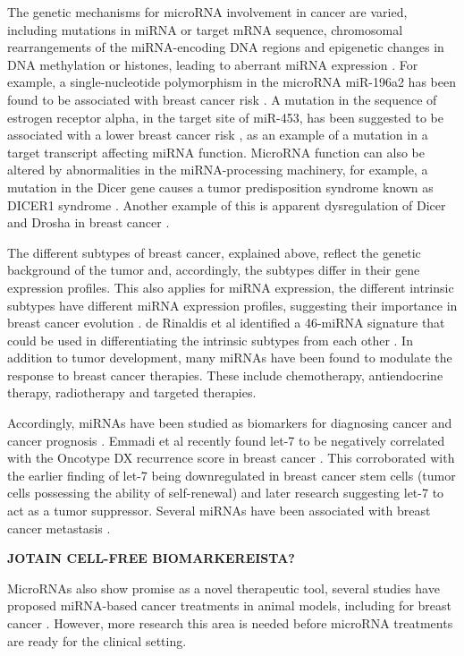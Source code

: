 The genetic mechanisms for microRNA involvement in cancer are varied,
including mutations in miRNA or target mRNA sequence, chromosomal
rearrangements of the miRNA-encoding DNA regions and epigenetic changes in DNA
methylation or histones, leading to aberrant miRNA expression
\citep{Calin2006,Melo2011}. For example, a single-nucleotide polymorphism
in the microRNA miR-196a2 has been found to be associated with breast cancer
risk \citep{Gao2011}. A mutation in the sequence of estrogen receptor alpha,
in the target site of miR-453, has been suggested to be associated with a
lower breast cancer risk \citep{Tchatchou2009}, as an example of a mutation in
a target transcript affecting miRNA function. MicroRNA function can also be
altered by abnormalities in the miRNA-processing machinery, for example, a
mutation in the Dicer gene causes a tumor predisposition syndrome known as
DICER1 syndrome \citep{Slade2011}. Another example of this is apparent
dysregulation of Dicer and Drosha in breast cancer
\citep{Yan2012}.

The different subtypes of breast cancer, explained above, reflect the genetic
background of the tumor and, accordingly, the subtypes differ in their gene
expression profiles. This also applies for miRNA expression, the different
intrinsic subtypes have different miRNA expression profiles, suggesting their
importance in breast cancer evolution \citep{Blenkiron2007}. de Rinaldis et al
identified a 46-miRNA signature that could be used in differentiating the
intrinsic subtypes from each other \citep{deRinaldis2013}. In addition to
tumor development, many miRNAs have been found to modulate the response to
breast cancer therapies. These include chemotherapy, antiendocrine therapy,
radiotherapy and targeted therapies.

Accordingly, miRNAs have been studied as biomarkers for diagnosing cancer and
cancer prognosis \citep{}. Emmadi et al recently found let-7 to be negatively
correlated with the Oncotype DX recurrence score in breast cancer
\citep{Emmadi2015}. This corroborated with the earlier finding of let-7 being
downregulated in breast cancer stem cells (tumor cells possessing the ability
of self-renewal) \citep{Yu2007} and later research suggesting let-7 to act as
a tumor suppressor. Several miRNAs have been associated with breast cancer
metastasis \citep{Chen2016}.

\textbf{JOTAIN CELL-FREE BIOMARKEREISTA?}

MicroRNAs also show promise as a novel therapeutic tool, several studies have
proposed miRNA-based cancer treatments in animal models, including for breast
cancer \citep{VanRooij2014}. However, more research this area is needed before
microRNA treatments are ready for the clinical setting.

